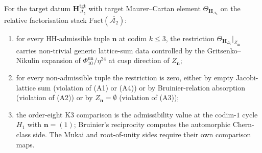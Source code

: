 \begin{proposition}
\label{prop:hh-filter-bar-cobar-data}
%
For the target datum $\mathbf{H}_{\Delta_5}^{\mathrm{tgt}}$ with
target Maurer--Cartan element $\Theta_{\mathbf{H}_{\Delta_5}}$ on the
relative factorisation stack $\mathrm{Fact}(\overline{\mathcal{A}_2})$:
\begin{enumerate}[label=\textup{(\alph*)}]
\item for every HH-admissible tuple $\mathbf{n}$ at codim $k \le 3$, the restriction $\Theta_{\mathbf{H}_{\Delta_5}}|_{Z_{\mathbf{n}}}$ carries non-trivial generic lattice-sum data controlled by the Gritsenko--Nikulin expansion of $\Phi_{10}^{\mathrm{un}}/\eta^{24}$ at cusp direction of $Z_{\mathbf{n}}$;
\item for every non-admissible tuple the restriction is zero, either by empty Jacobi-lattice sum (violation of (A1) or (A4)) or by Bruinier-relation absorption (violation of (A2)) or by $Z_{\mathbf{n}} = \emptyset$ (violation of (A3));
\item the order-eight K3 comparison is the admissibility value at the
codim-$1$ cycle \(H_1\) with \(\mathbf n=(1)\); Bruinier's reciprocity
computes the automorphic Chern-class side. The Mukai and
root-of-unity sides require their own comparison maps.
\end{enumerate}
\end{proposition}

